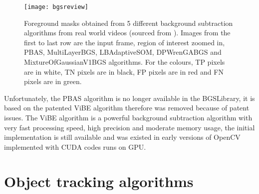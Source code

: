 \begin{figure}[tbh]
  \centering
  \texttt{[image: bgsreview]}
  \caption{Foreground masks obtained from 5 different background subtraction algorithms from real world videos (sourced from \cite{bgs:article}). Images from the first to last row are the input frame, region of interest zoomed in, PBAS, MultiLayerBGS, LBAdaptiveSOM, DPWrenGABGS and MixtureOfGaussianV1BGS algorithms. For the colours, TP pixels are in white, TN pixels are in black, FP pixels are in red and FN pixels are in green.}
  \label{bgsreview}
\end{figure}

Unfortunately, the PBAS algorithm is no longer available in the BGSLibrary, it is based on the patented ViBE algorithm \cite{barnich2011vibe} therefore was removed because of patent issues. The ViBE algorithm is a powerful background subtraction algorithm with very fast processing speed, high precision and moderate memory usage, the initial implementation is still available and was existed in early versions of OpenCV implemented with CUDA codes runs on GPU.

\iffalse
\subsection{Optical flow}

Optical flow is another widely used object tracking algorithm, it can be used for detect moving objects as well.

There are 2 types of optical flow algorithms. One is sparse feature set (Lucas-Kanade method \cite{bouguet2001pyramidal}), it evaluates pixel movements around selected feature points, therefore calculates movements of feature points. Another type is dense optical flow (Gunner Farneback's algorithm \cite{farneback2003two}), it evaluates pixel movements for all pixels in the frame.

{\color{red}More descriptions and images?}

By rendering pixel movements in 3 axes computed from dense optical flow as 3 components (RGB) colours, then find out regions with the same colour, sizes and positions of moving objects in the scene can then be determined. However, once an object stopped moving, the optical flow algorithms cannot distinguish the object from background any longer.
\fi

\section{Object tracking algorithms}
\label{bg:tracking}

